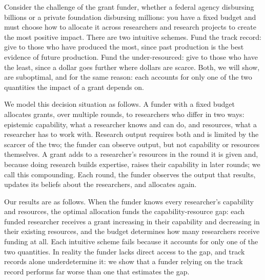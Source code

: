 \documentclass[article, 11pt, reqno]{amsart}
\theoremstyle{named}
\begin{document}
Consider the challenge of the grant funder, whether a federal agency disbursing billions or a private foundation disbursing millions: you have a fixed budget and must choose how to allocate it across researchers and research projects to create the most positive impact. There are two intuitive schemes. Fund the track record: give to those who have produced the most, since past production is the best evidence of future production. Fund the under-resourced: give to those who have the least, since a dollar goes further where dollars are scarce. Both, we will show, are suboptimal, and for the same reason: each accounts for only one of the two quantities the impact of a grant depends on.

We model this decision situation as follows. A funder with a fixed budget allocates grants, over multiple rounds, to researchers who differ in two ways: epistemic capability, what a researcher knows and can do, and resources, what a researcher has to work with. Research output requires both and is limited by the scarcer of the two; the funder can observe output, but not capability or resources themselves. A grant adds to a researcher's resources in the round it is given and, because doing research builds expertise, raises their capability in later rounds; we call this compounding. Each round, the funder observes the output that results, updates its beliefs about the researchers, and allocates again.

Our results are as follows. When the funder knows every researcher's capability and resources, the optimal allocation funds the capability-resource gap: each funded researcher receives a grant increasing in their capability and decreasing in their existing resources, and the budget determines how many researchers receive funding at all. Each intuitive scheme fails because it accounts for only one of the two quantities. In reality the funder lacks direct access to the gap, and track records alone underdetermine it: we show that a funder relying on the track record performs far worse than one that estimates the gap.
\end{document}
